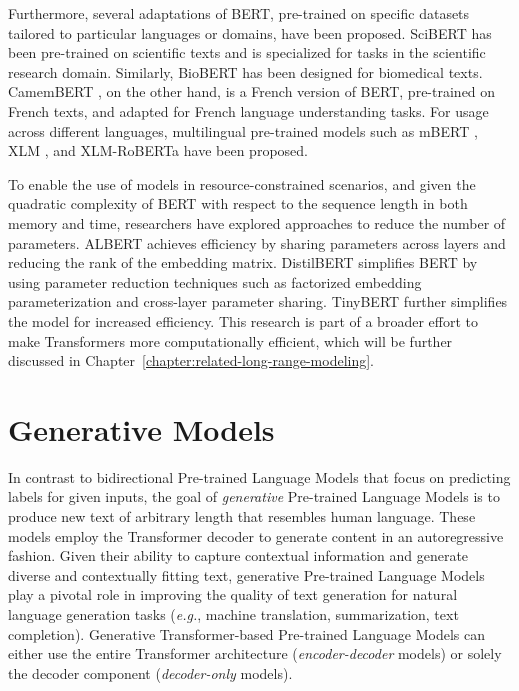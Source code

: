 Furthermore, several adaptations of \ac{BERT}, pre-trained on specific datasets tailored to particular languages or domains, have been proposed. SciBERT \citep{beltagy2019scibert} has been pre-trained on scientific texts and is specialized for tasks in the scientific research domain. Similarly, BioBERT \citep{lee2020biobert} has been designed for biomedical texts. CamemBERT \citep{martin2019camembert}, on the other hand, is a French version of \ac{BERT}, pre-trained on French texts, and adapted for French language understanding tasks. For usage across different languages, multilingual pre-trained models such as mBERT \citep{devlin2018bert}, XLM \citep{lample2019cross}, and XLM-RoBERTa \citep{conneau2019unsupervised} have been proposed. 

To enable the use of models in resource-constrained scenarios, and given the quadratic complexity of \ac{BERT} with respect to the sequence length in both memory and time, researchers have explored approaches to reduce the number of parameters. \ac{ALBERT} achieves efficiency by sharing parameters across layers and reducing the rank of the embedding matrix. DistilBERT \citep{sanh2019distilbert} simplifies \ac{BERT} by using parameter reduction techniques such as factorized embedding parameterization and cross-layer parameter sharing. TinyBERT \citep{jiao2019tinybert} further simplifies the model for increased efficiency. This research is part of a broader effort to make Transformers more computationally efficient, which will be further discussed in Chapter~\ref{chapter:related-long-range-modeling}.

\section{Generative Models} 

In contrast to bidirectional Pre-trained Language Models that focus on predicting labels for given inputs, the goal of \textit{generative} Pre-trained Language Models is to produce new text of arbitrary length that resembles human language. These models employ the Transformer decoder to generate content in an autoregressive fashion. Given their ability to capture contextual information and generate diverse and contextually fitting text, generative Pre-trained Language Models play a pivotal role in improving the quality of text generation for natural language generation tasks (\textit{e.g.}, machine translation, summarization, text completion). Generative Transformer-based Pre-trained Language Models can either use the entire Transformer architecture (\textit{encoder-decoder} models) or solely the decoder component (\textit{decoder-only} models).

